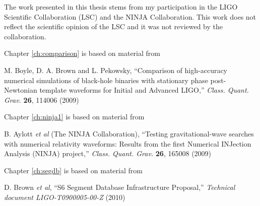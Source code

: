 \documentclass[12pt,notitlepage]{report}
\begin{document}
\havededicationtrue
\dedication{to\\ my parents}
\haveminorfalse
\copyrighttrue
\doctoratetrue
\fi

\pagestyle{syrheadings}
\setcounter{page}{4}
\tableofcontents

\figurespagetrue
\tablespagetrue




\afterpreface
\setcounter{page}{13}
The work presented in this thesis stems from my participation in the
LIGO Scientific Collaboration (LSC) and the NINJA Collaboration.  This
work does not reflect the scientific opinion of the LSC and it was not
reviewed by the collaboration.

\iffalse
\vspace*{0.5cm}

\noindent Chapter \ref{ch:comparison} is based on material from

\vspace*{0.25cm}

\noindent M. Boyle, D. A. Brown and L. Pekowsky, ``Comparison of high-accuracy
numerical simulations of black-hole binaries with stationary phase
post-Newtonian template waveforms for Initial and Advanced LIGO,''
{\it Class. Quant. Grav.} {\bf 26}, 114006 (2009)

\vspace*{0.5cm}

\noindent Chapter \ref{ch:ninja1} is based on material from

\vspace*{0.25cm}

\noindent B. Aylott {\it et al} (The NINJA Collaboration), ``Testing
gravitational-wave searches with numerical relativity waveforms:
Results from the first Numerical INJection Analysis (NINJA) project,''
{\it Class. Quant. Grav.} {\bf 26}, 165008 (2009)


\vspace*{0.5cm}

\noindent Chapter \ref{ch:segdb} is based on material from

\vspace*{0.25cm}

\noindent D. Brown {\it et al}, ``S6 Segment Database
Infrastructure Proposal,'' {\it Technical document
{LIGO}-T0900005-00-Z} (2010)
\end{document}
